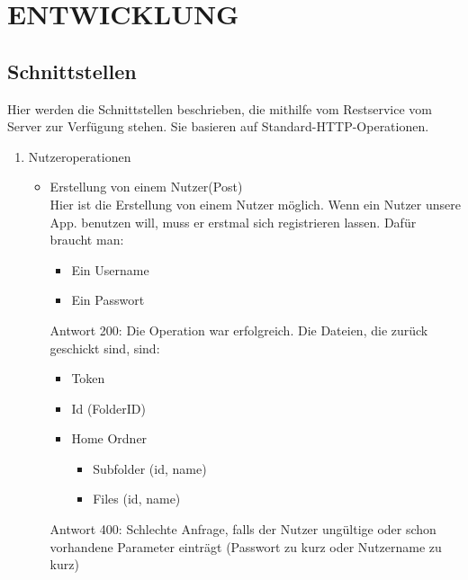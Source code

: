 \section{\uppercase{Entwicklung}}
\subsection{Schnittstellen}
Hier werden die Schnittstellen beschrieben, die mithilfe vom Restservice vom Server zur Verf\"ugung stehen. Sie basieren auf Standard-HTTP-Operationen.
\begin{enumerate}
\item Nutzeroperationen
\begin{itemize}
\item Erstellung von einem Nutzer(Post) \\
Hier ist die Erstellung von einem Nutzer m\"oglich. Wenn ein Nutzer unsere App. benutzen will, muss er erstmal sich registrieren lassen. Daf\"ur braucht man: 
\begin{itemize}
\item Ein Username 
\item Ein Passwort 
\end{itemize}
Antwort 200: Die Operation war erfolgreich. Die Dateien, die zurück geschickt sind, sind:
\begin{itemize}
\item Token
\item Id (FolderID)
\item Home Ordner
	\begin{itemize}
	\item Subfolder (id, name)
	\item Files (id, name)
	\end{itemize}
\end{itemize}

Antwort 400: Schlechte Anfrage, falls der Nutzer ung\"ultige oder schon vorhandene Parameter eintr\"agt (Passwort zu kurz oder Nutzername zu kurz)


\end{itemize}
\end{enumerate}
